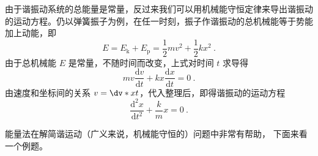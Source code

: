

由于谐振动系统的总能量是常量，反过来我们可以用机械能守恒定律来导出谐振动的运动方程。仍以弹簧振子为例，在任一时刻，振子作谐振动的总机械能等于势能加上动能，即
\begin{equation}
E=E_{\mathrm k}+E_{\mathrm p}=\frac{1}{2} m v^{2}+\frac{1}{2} k x^{2}~.
\end{equation}
由于总机械能 $E$ 是常量，不随时间而改变，上式对时间 $t$ 求导得
\begin{equation}
m v \frac{\mathrm{d} v}{\mathrm{d} t}+k x \frac{\mathrm{d} x}{\mathrm{d} t}=0~.
\end{equation}
由速度和坐标间的关系 $v = \dv*{x}{t}$，代入整理后，即得谐振动的运动方程
\begin{equation}
\frac{\mathrm{d}^{2} x}{\mathrm{d} t^{2}}+\frac{k}{m} x=0~.
\end{equation}

能量法在解简谐运动（广义来说，机械能守恒的）问题中非常有帮助， 下面来看一个例题。 

